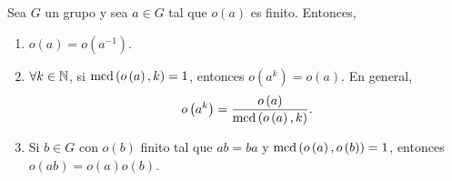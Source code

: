 \begin{lema}
Sea $\displaystyle G $ un grupo y sea $\displaystyle a \in G $ tal que $\displaystyle o\left(a\right) $ es finito. Entonces,
\begin{enumerate}
\item $\displaystyle o\left(a\right) = o\left(a^{-1}\right) $.
\item $\displaystyle \forall k \in \mathbb{N} $, si $\displaystyle \text{mcd}\left(o\left(a\right), k\right) = 1 $, entonces $\displaystyle o\left(a^{k}\right) = o\left(a\right) $. En general,
	\[o\left(a^{k}\right) = \frac{o\left(a\right)}{\text{mcd}\left(o\left(a\right), k\right)} .\]
\item Si $\displaystyle b \in G $ con $\displaystyle o\left(b\right) $ finito tal que $\displaystyle ab = ba $ y $\displaystyle \text{mcd}\left(o\left(a\right), o\left(b\right)\right) = 1 $, entonces $\displaystyle o\left(ab\right) = o\left(a\right) o \left(b\right)$.
\end{enumerate}
\end{lema}
